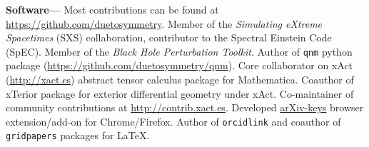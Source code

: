 \documentclass[margin,line]{res}
\begin{document}
\begin{resume}

{\bf Software---}%
Most contributions can be found at \url{https://github.com/duetosymmetry}.
Member of the {\it Simulating eXtreme Spacetimes} (SXS) collaboration,
contributor to the Spectral Einstein Code (SpEC).
Member of the {\it Black Hole Perturbation Toolkit}. Author of
{\tt qnm} python package (\url{https://github.com/duetosymmetry/qnm}).
Core collaborator on {\sc xAct} (\url{http://xact.es}) abstract
tensor calculus package for {\sc  Mathematica}. Coauthor
of {\sc xTerior} package for exterior differential geometry under
{\sc xAct}. Co-maintainer of community contributions at
\url{http://contrib.xact.es}. Developed
\href{https://chrome.google.com/webstore/detail/arxiv-keys/fkjjdlbhliopfhgddlpoggpmpgjfaojd}{arXiv-keys}
browser extension/add-on for Chrome/Firefox.
Author of {\tt orcidlink} and coauthor of {\tt gridpapers} packages for \LaTeX.


\ifx\nopubs\undefined

\else
%
\fi





\end{resume}
\end{document}
